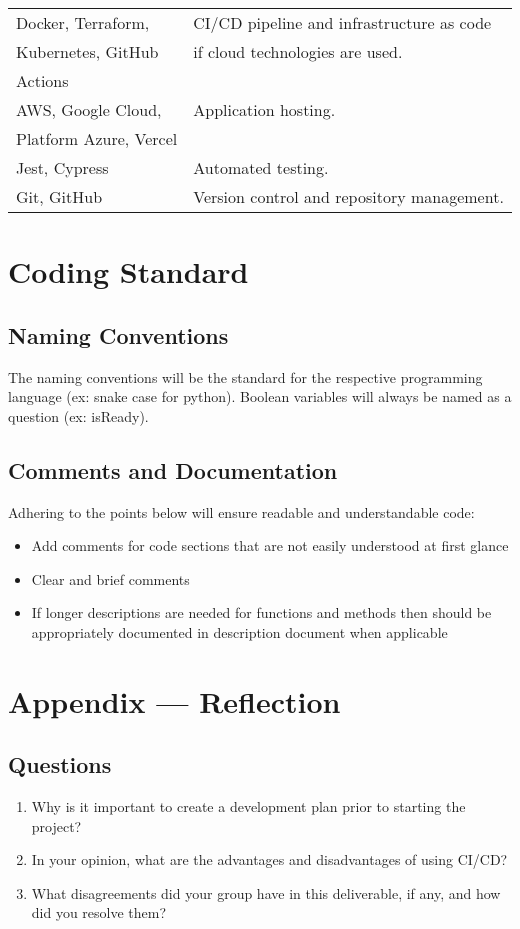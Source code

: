 \documentclass{article}
\begin{document}
\begin{table}[H]
\begin{tabular}{|l|l|}
\hline
Docker, Terraform, & CI/CD pipeline and infrastructure as code \\ 
Kubernetes, GitHub & if cloud technologies are used. \\ 
Actions & \\
\hline
AWS, Google Cloud, & Application hosting. \\ 
Platform Azure, Vercel & \\
\hline
Jest, Cypress & Automated testing. \\ 
\hline
Git, GitHub & Version control and repository management. \\ 
\hline
\end{tabular}
\end{table}

\section{Coding Standard}
\subsection{Naming Conventions}
The naming conventions will be the standard for the respective programming language (ex: snake case for python). Boolean variables will always be named as a question (ex: isReady).

\subsection{Comments and Documentation}
Adhering to the points below will ensure readable and understandable code:
\begin{itemize}
\item Add comments for code sections that are not easily understood at first glance
\item Clear and brief comments
\item If longer descriptions are needed for functions and methods then should be appropriately
documented in description document when applicable
\end{itemize}


\newpage{}

\section*{Appendix --- Reflection}
\subsection*{Questions}
\begin{enumerate}
    \item Why is it important to create a development plan prior to starting the
    project?
    \item In your opinion, what are the advantages and disadvantages of using
    CI/CD?
    \item What disagreements did your group have in this deliverable, if any,
    and how did you resolve them?
\end{enumerate}
\end{document}
